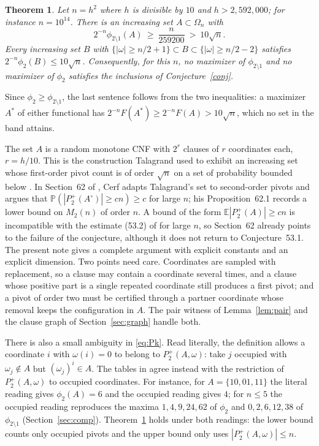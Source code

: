 \documentclass[11pt]{amsart}
\newtheorem{theorem}{Theorem}[section]
\theoremstyle{definition}
\theoremstyle{remark}
\numberwithin{equation}{section}
\newcommand{\Pp}{\mathbb P}
\newcommand{\E}{\mathbb E}
\begin{document}
\begin{theorem}\label{thm:main}
Let $n=h^2$ where $h$ is divisible by $10$ and $h>2{,}592{,}000$; for instance $n=10^{14}$. There is an increasing set $A\subset\Omega_n$ with
\[
2^{-n}\phi_{2\setminus1}(A)\ \ge\ \frac{n}{259200}\ >\ 10\sqrt n .
\]
Every increasing set $B$ with $\{|\omega|\ge n/2+1\}\subset B\subset\{|\omega|\ge n/2-2\}$ satisfies $2^{-n}\phi_2(B)\le10\sqrt n$. Consequently, for this $n$, no maximizer of $\phi_{2\setminus1}$ and no maximizer of $\phi_2$ satisfies the inclusions of Conjecture~\ref{conj}.
\end{theorem}

Since $\phi_2\ge\phi_{2\setminus1}$, the last sentence follows from the two inequalities: a maximizer $A^*$ of either functional has $2^{-n}F(A^*)\ge2^{-n}F(A)>10\sqrt n$, which no set in the band attains.

The set $A$ is a random monotone CNF with $2^r$ clauses of $r$ coordinates each, $r=h/10$. This is the construction Talagrand used to exhibit an increasing set whose first-order pivot count is of order $\sqrt n$ on a set of probability bounded below \cite{T}. In Section~62 of \cite{C}, Cerf adapts Talagrand's set to second-order pivots and argues that $\Pp(|P_2^+(A^\circ)|\ge cn)\ge c$ for large $n$; his Proposition~62.1 records a lower bound on $M_2(n)$ of order $n$. A bound of the form $\E|P_2^+(A)|\ge cn$ is incompatible with the estimate (53.2) of \cite{C} for large $n$, so Section~62 already points to the failure of the conjecture, although it does not return to Conjecture~53.1. The present note gives a complete argument with explicit constants and an explicit dimension. Two points need care. Coordinates are sampled with replacement, so a clause may contain a coordinate several times, and a clause whose positive part is a single repeated coordinate still produces a first pivot; and a pivot of order two must be certified through a partner coordinate whose removal keeps the configuration in $A$. The pair witness of Lemma~\ref{lem:pair} and the clause graph of Section~\ref{sec:graph} handle both.

There is also a small ambiguity in \eqref{eq:Pk}. Read literally, the definition allows a coordinate $i$ with $\omega(i)=0$ to belong to $P_2^+(A,\omega)$: take $j$ occupied with $\omega_j\notin A$ but $(\omega_j)^i\in A$. The tables in \cite[\S\S51--52]{C} agree instead with the restriction of $P_2^+(A,\omega)$ to occupied coordinates. For instance, for $A=\{10,01,11\}$ the literal reading gives $\phi_2(A)=6$ and the occupied reading gives $4$; for $n\le5$ the occupied reading reproduces the maxima $1,4,9,24,62$ of $\phi_2$ and $0,2,6,12,38$ of $\phi_{2\setminus1}$ (Section~\ref{sec:comp}). Theorem~\ref{thm:main} holds under both readings: the lower bound counts only occupied pivots and the upper bound only uses $|P_2^+(A,\omega)|\le n$.
\end{document}
